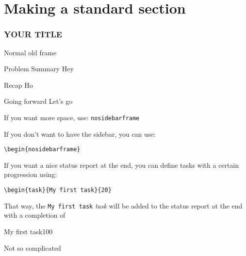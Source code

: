 

\section{Making a standard section}

\begin{frame}\frametitle{YOUR TITLE}
Normal old frame		
\end{frame}

\begin{frame}	
	\begin{block}{Problem Summary}
	Hey
	\end{block}
	
	
	\begin{exampleblock}{Recap}
	Ho
	\end{exampleblock}
	
	\begin{alertblock}{Going forward}
	Let's go
	\end{alertblock}

\end{frame}


\begin{nosidebarframe}
\centering
 If you want more space, use: \texttt{nosidebarframe}
\end{nosidebarframe}






\begin{frame}[containsverbatim]

If you don't want to have the sidebar, you can use:

\verb|\begin{nosidebarframe}|

If you want a nice status report at the end, you can define tasks with a certain progression using:

\verb|\begin{task}{My first task}{20}|

That way, the \texttt{My first task} \textit{task} will be added to the status report at the end with a completion of 

\end{frame}


\begin{task}{My first task}{100}

Not so complicated 

\end{task}

